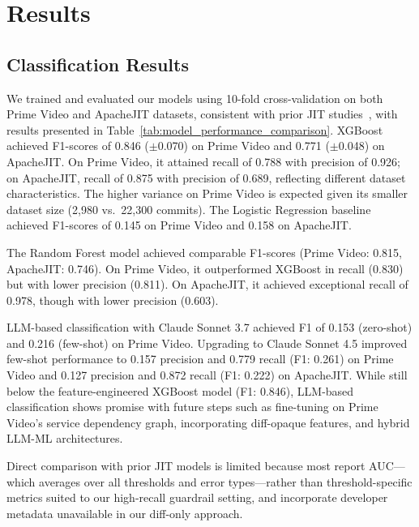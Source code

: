 \section{Results}

\subsection{Classification Results}




We trained and evaluated our models using 10-fold cross-validation on both Prime Video and ApacheJIT datasets, consistent with prior JIT studies~\cite{kamei2012large,hoang2019deepjit}, with results presented in Table~\ref{tab:model_performance_comparison}. XGBoost achieved F1-scores of 0.846 ($\pm$0.070) on Prime Video and 0.771 ($\pm$0.048) on ApacheJIT. On Prime Video, it attained recall of 0.788 with precision of 0.926; on ApacheJIT, recall of 0.875 with precision of 0.689, reflecting different dataset characteristics. The higher variance on Prime Video is expected given its smaller dataset size (2,980 vs.\ 22,300 commits). The Logistic Regression baseline achieved F1-scores of 0.145 on Prime Video and 0.158 on ApacheJIT.




The Random Forest model achieved comparable F1-scores (Prime Video: 0.815, ApacheJIT: 0.746). On Prime Video, it outperformed XGBoost in recall (0.830) but with lower precision (0.811). On ApacheJIT, it achieved exceptional recall of 0.978, though with lower precision (0.603).

LLM-based classification with Claude Sonnet 3.7 achieved F1 of 0.153 (zero-shot) and 0.216 (few-shot) on Prime Video. Upgrading to Claude Sonnet 4.5 improved few-shot performance to 0.157 precision and 0.779 recall (F1: 0.261) on Prime Video and 0.127 precision and 0.872 recall (F1: 0.222) on ApacheJIT. While still below the feature-engineered XGBoost model (F1: 0.846), LLM-based classification shows promise with future steps such as fine-tuning on Prime Video's service dependency graph, incorporating diff-opaque features, and hybrid LLM-ML architectures.

Direct comparison with prior JIT models is limited because most report AUC---which averages over all thresholds and error types---rather than threshold-specific metrics suited to our high-recall guardrail setting, and incorporate developer metadata unavailable in our diff-only approach.

